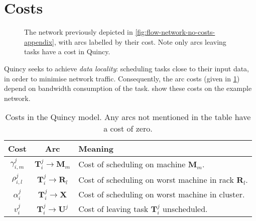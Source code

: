 \section{Costs} \label{appendix:flow-scheduling:costs}

\begin{figure}
    \centering
    
    \caption[Costs in a Quincy scheduling flow network]{The network previously depicted in \cref{fig:flow-network-no-costs-appendix}, with arcs labelled by their cost. Note only arcs leaving tasks have a cost in Quincy.}
    \label{fig:flow-network-with-costs}
\end{figure}

Quincy seeks to achieve \emph{data locality}: scheduling tasks close to their input data, in order to minimise network traffic. Consequently, the arc costs (given in \cref{table:quincy-costs}) depend on bandwidth consumption of the task.  show these costs on the example network.

\begin{table}
    \centering
    \begin{tabular}{ccl}
        \textbf{Cost} & \textbf{Arc} & \textbf{Meaning}\tabularnewline
        \hline 
        $\gamma_{i,m}^{j}$ & $\mathbf{T}_{i}^{j}\to\mathbf{M}_{m}$ & Cost of scheduling on machine $\mathbf{M}_{m}$.\tabularnewline
        $\rho_{i,l}^{j}$ & $\mathbf{T}_{i}^{j}\to\mathbf{R}_{l}$ & Cost of scheduling on worst machine in rack $\mathbf{R}_{l}$.\tabularnewline
        $\alpha_{i}^{j}$ & $\mathbf{T}_{i}^{j}\to\mathbf{X}$ & Cost of scheduling on worst machine in cluster.\tabularnewline
        $v_{i}^{j}$ & $\mathbf{T}_{i}^{j}\to\mathbf{U}^{j}$ & Cost of leaving task $\mathbf{T}_{i}^{j}$ unscheduled.\tabularnewline
    \end{tabular}
    \caption[Costs in the Quincy model]{Costs in the Quincy model. Any arcs not mentioned in the table have a cost of zero\footnotemark.}
    \label{table:quincy-costs}
\end{table}

